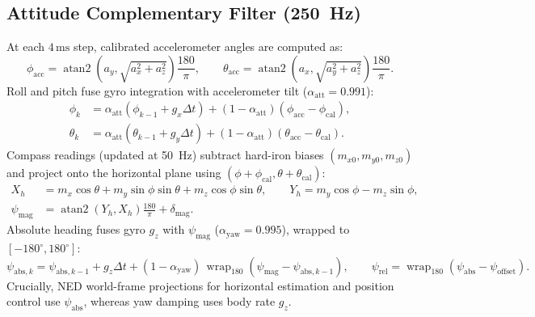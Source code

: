 \documentclass[11pt,a4paper]{article}
\begin{document}
\subsection{Attitude Complementary Filter (250~Hz)}
At each $4\,\text{ms}$ step, calibrated accelerometer angles are computed as:
\begin{equation}
  \phi_{\text{acc}} = \operatorname{atan2}\!\left(a_y, \sqrt{a_x^2 + a_z^2}\right)\frac{180}{\pi}, \qquad
  \theta_{\text{acc}} = \operatorname{atan2}\!\left(a_x, \sqrt{a_y^2 + a_z^2}\right)\frac{180}{\pi}.
\end{equation}
Roll and pitch fuse gyro integration with accelerometer tilt ($\alpha_{\text{att}} = 0.991$):
\begin{align}
  \phi_k   &= \alpha_{\text{att}}\left(\phi_{k-1} + g_x \Delta t\right) + (1 - \alpha_{\text{att}})\left(\phi_{\text{acc}} - \phi_{\text{cal}}\right), \\
  \theta_k &= \alpha_{\text{att}}\left(\theta_{k-1} + g_y \Delta t\right) + (1 - \alpha_{\text{att}})\left(\theta_{\text{acc}} - \theta_{\text{cal}}\right).
\end{align}
Compass readings (updated at 50~Hz) subtract hard-iron biases $(m_{x0}, m_{y0}, m_{z0})$ and project onto the horizontal plane using $(\phi + \phi_{\text{cal}}, \theta + \theta_{\text{cal}})$:
\begin{align}
  X_h &= m_x \cos\theta + m_y \sin\phi\sin\theta + m_z \cos\phi\sin\theta, \qquad
  Y_h = m_y \cos\phi - m_z \sin\phi, \\
  \psi_{\text{mag}} &= \operatorname{atan2}(Y_h, X_h)\frac{180}{\pi} + \delta_{\text{mag}}.
\end{align}
Absolute heading fuses gyro $g_z$ with $\psi_{\text{mag}}$ ($\alpha_{\text{yaw}} = 0.995$), wrapped to $[-180^\circ, 180^\circ]$:
\begin{equation}
  \psi_{\text{abs},k} = \psi_{\text{abs},k-1} + g_z \Delta t + (1 - \alpha_{\text{yaw}})\,\operatorname{wrap}_{180}(\psi_{\text{mag}} - \psi_{\text{abs},k-1}), \qquad
  \psi_{\text{rel}} = \operatorname{wrap}_{180}(\psi_{\text{abs}} - \psi_{\text{offset}}).
\end{equation}
Crucially, NED world-frame projections for horizontal estimation and position control use $\psi_{\text{abs}}$, whereas yaw damping uses body rate $g_z$.
\end{document}
